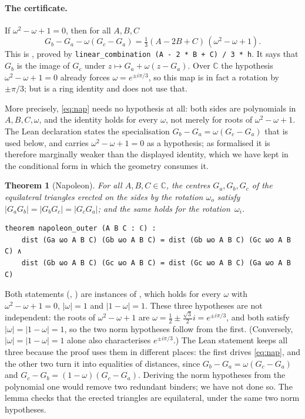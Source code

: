 \documentclass[11pt]{article}
\newtheorem{theorem}{Theorem}
\theoremstyle{definition}
\theoremstyle{remark}
\newcommand{\lean}[1]{\texttt{#1}}
\newcommand{\CC}{\mathbb{C}}
\begin{document}
\paragraph{The certificate.} If $\omega^2-\omega+1=0$, then for all $A,B,C$
\begin{equation}\label{eq:nap}
G_b-G_a-\omega(G_c-G_a)=\tfrac13(A-2B+C)\,(\omega^2-\omega+1).
\end{equation}
This is , proved by \lean{linear\_combination (A - 2 * B + C) / 3 * h}. It says that
$G_b$ is the image of $G_c$ under $z\mapsto G_a+\omega(z-G_a)$. Over $\CC$ the hypothesis
$\omega^2-\omega+1=0$ already forces $\omega=e^{\pm i\pi/3}$, so this map is in fact a rotation by
$\pm\pi/3$; but  is a ring identity and does not use that.

More precisely, \eqref{eq:nap} needs no hypothesis at all: both sides are polynomials in
$A,B,C,\omega$, and the identity holds for every $\omega$, not merely for roots of
$\omega^2-\omega+1$. The Lean declaration  states the specialisation
$G_b-G_a=\omega(G_c-G_a)$ that is used below, and carries $\omega^2-\omega+1=0$ as a hypothesis;
as formalised it is therefore marginally weaker than the displayed identity, which we have kept in
the conditional form in which the geometry consumes it.

\begin{theorem}[Napoleon]\label{thm:napoleon}
For all $A,B,C\in\CC$, the centres $G_a,G_b,G_c$ of the equilateral triangles erected on the
sides by the rotation $\omega_o$ satisfy $|G_aG_b|=|G_bG_c|=|G_cG_a|$; and the same holds for
the rotation~$\omega_i$.
\end{theorem}

\begin{lstlisting}
theorem napoleon_outer (A B C : ℂ) :
    dist (Ga ωo A B C) (Gb ωo A B C) = dist (Gb ωo A B C) (Gc ωo A B C) ∧
    dist (Gb ωo A B C) (Gc ωo A B C) = dist (Gc ωo A B C) (Ga ωo A B C)
\end{lstlisting}

Both statements (, ) are instances of
, which holds for every $\omega$ with $\omega^2-\omega+1=0$,
$|\omega|=1$ and $|1-\omega|=1$. These three hypotheses are not independent: the roots of
$\omega^2-\omega+1$ are $\omega=\tfrac12\pm\tfrac{\sqrt3}2i=e^{\pm i\pi/3}$, and both satisfy
$|\omega|=|1-\omega|=1$, so the two norm hypotheses follow from the first. (Conversely,
$|\omega|=|1-\omega|=1$ alone also characterises $e^{\pm i\pi/3}$.) The Lean statement keeps all
three because the proof uses them in different places: the first drives \eqref{eq:nap}, and the
other two turn it into equalities of distances, since $G_b-G_a=\omega(G_c-G_a)$ and
$G_c-G_b=(1-\omega)(G_c-G_a)$. Deriving the norm hypotheses from the polynomial one would remove
two redundant binders; we have not done so. The lemma
 checks that the erected triangles are equilateral, under the
same two norm hypotheses.
\end{document}

